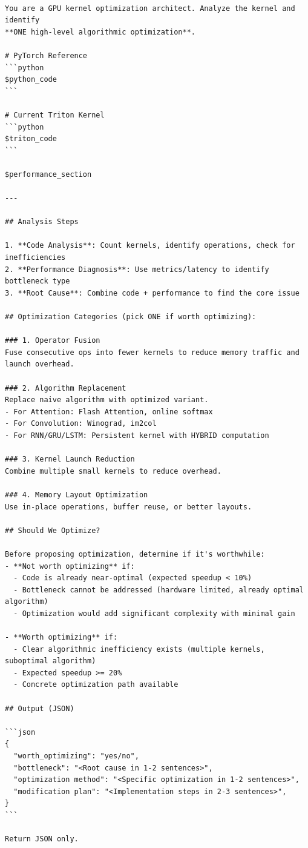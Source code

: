 \begin{mdframed}[linewidth=1pt, linecolor=black, backgroundcolor=gray!5]
\begin{lstlisting}

You are a GPU kernel optimization architect. Analyze the kernel and identify
**ONE high-level algorithmic optimization**.

# PyTorch Reference
```python
$python_code
```

# Current Triton Kernel
```python
$triton_code
```

$performance_section

---

## Analysis Steps

1. **Code Analysis**: Count kernels, identify operations, check for inefficiencies
2. **Performance Diagnosis**: Use metrics/latency to identify bottleneck type
3. **Root Cause**: Combine code + performance to find the core issue

## Optimization Categories (pick ONE if worth optimizing):

### 1. Operator Fusion
Fuse consecutive ops into fewer kernels to reduce memory traffic and launch overhead.

### 2. Algorithm Replacement
Replace naive algorithm with optimized variant.
- For Attention: Flash Attention, online softmax
- For Convolution: Winograd, im2col
- For RNN/GRU/LSTM: Persistent kernel with HYBRID computation

### 3. Kernel Launch Reduction
Combine multiple small kernels to reduce overhead.

### 4. Memory Layout Optimization
Use in-place operations, buffer reuse, or better layouts.

## Should We Optimize?

Before proposing optimization, determine if it's worthwhile:
- **Not worth optimizing** if:
  - Code is already near-optimal (expected speedup < 10%)
  - Bottleneck cannot be addressed (hardware limited, already optimal algorithm)
  - Optimization would add significant complexity with minimal gain

- **Worth optimizing** if:
  - Clear algorithmic inefficiency exists (multiple kernels, suboptimal algorithm)
  - Expected speedup >= 20%
  - Concrete optimization path available

## Output (JSON)

```json
{
  "worth_optimizing": "yes/no",
  "bottleneck": "<Root cause in 1-2 sentences>",
  "optimization method": "<Specific optimization in 1-2 sentences>",
  "modification plan": "<Implementation steps in 2-3 sentences>",
}
```

Return JSON only.
\end{lstlisting}
\end{mdframed}

